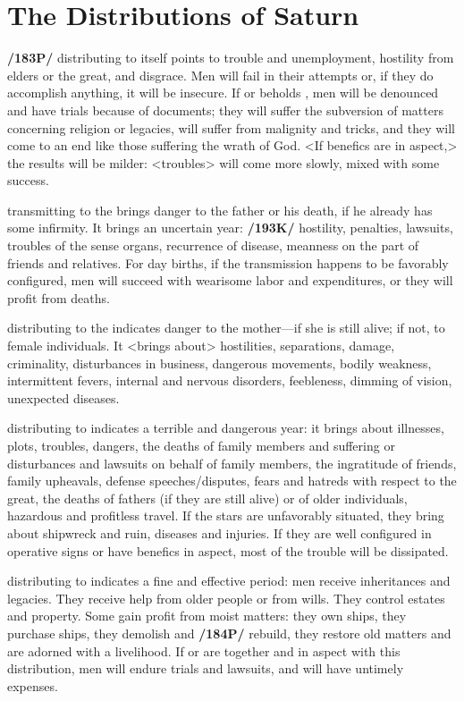 \section{The Distributions of Saturn}

\textbf{/183P/} \Saturn\xspace distributing to itself points to trouble and unemployment, hostility from elders or the great, and disgrace. Men will fail in their attempts or, if they do accomplish anything, it will be insecure. If \Mercury\xspace or \Mars\xspace beholds \Saturn, men will be denounced and have trials because of documents; they will suffer the subversion of matters concerning religion or legacies, will suffer from malignity and tricks, and they will come to an end like those suffering the wrath of God. <If benefics are in aspect,> the results will be milder: <troubles> will come more slowly, mixed with some success.

\Saturn\xspace transmitting to the \Sun\xspace brings danger to the father or his death, if he already has some infirmity.
It brings an uncertain year: \textbf{/193K/} hostility, penalties, lawsuits, troubles of the sense organs, recurrence of disease, meanness on the part of friends and relatives. For day births, if the transmission happens to be favorably configured, men will succeed with wearisome labor and expenditures, or they will profit from deaths. 

\Saturn\xspace distributing to the \Moon\xspace indicates danger to the mother—if she is still alive; if not, to female
individuals. It <brings about> hostilities, separations, damage, criminality, disturbances in business, dangerous movements, bodily weakness, intermittent fevers, internal and nervous disorders, feebleness, dimming of vision, unexpected diseases.

\Saturn\xspace distributing to \Mars\xspace indicates a terrible and dangerous year: it brings about illnesses, plots,
troubles, dangers, the deaths of family members and suffering or disturbances and lawsuits on behalf of family members, the ingratitude of friends, family upheavals, defense speeches/disputes, fears and hatreds with respect to the great, the deaths of fathers (if they are still alive) or of older individuals, hazardous and profitless travel. If the stars are unfavorably situated, they bring about shipwreck and ruin, diseases and injuries. If they are well configured in operative signs or have benefics in aspect, most of the trouble will
be dissipated.

\Saturn\xspace distributing to \Jupiter\xspace indicates a fine and effective period: men receive inheritances and legacies. They receive help from older people or from wills. They control estates and property. Some gain profit from moist matters: they own ships, they purchase ships, they demolish and \textbf{/184P/} rebuild, they restore old matters and are adorned with a livelihood. If \Mars\xspace or \Mercury\xspace are together and in aspect with this distribution, men will endure trials and lawsuits, and will have untimely expenses.

